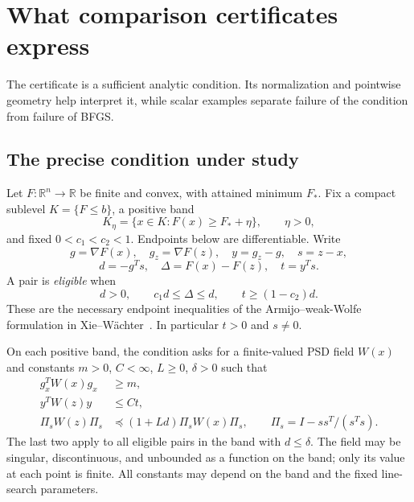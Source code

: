 \chapter{What comparison certificates express}\label{comp:G}\label{G:chapter}
\renewcommand{\ModuleTag}{5}
The certificate is a sufficient analytic condition. Its normalization and pointwise geometry help interpret it, while scalar examples separate failure of the condition from failure of BFGS.


\begingroup
\providecommand{\R}{}
\renewcommand{\R}{\mathbb R}
\providecommand{\PSD}{}
\renewcommand{\PSD}{\succeq0}
\providecommand{\range}{}
\renewcommand{\range}{\operatorname{range}}
\providecommand{\aff}{}
\renewcommand{\aff}{\operatorname{aff}}
\providecommand{\conv}{}
\renewcommand{\conv}{\operatorname{conv}}
\providecommand{\norm}{}
\renewcommand{\norm}[1]{\left\|#1\right\|}
\providecommand{\ip}{}
\renewcommand{\ip}[2]{\langle #1,#2\rangle}
\makeatletter\let\c@lemma\c@theorem\let\c@corollary\c@theorem\let\c@proposition\c@theorem\let\c@remark\c@theorem\makeatother
\renewcommand{\thelemma}{\thetheorem}\renewcommand{\thecorollary}{\thetheorem}\renewcommand{\theproposition}{\thetheorem}\renewcommand{\theremark}{\thetheorem}
\renewcommand{\thetheorem}{5.\arabic{section}.\arabic{theorem}}
\setcounter{section}{0}
\setcounter{theorem}{0}
\setcounter{equation}{0}


\section{The precise condition under study}
Let $F:\R^n\to\R$ be finite and convex, with attained minimum $F_*$. Fix a compact sublevel $K=\{F\le b\}$, a positive band
\[
 K_\eta=\{x\in K:F(x)\ge F_*+\eta\},\qquad \eta>0,
\]
and fixed $0<c_1<c_2<1$. Endpoints below are differentiable. Write
\[
 g=\nabla F(x),\quad g_z=\nabla F(z),\quad y=g_z-g,\quad s=z-x,
\]
\[
 d=-g^Ts,\quad \Delta=F(x)-F(z),\quad t=y^Ts.
\]
A pair is \emph{eligible} when
\begin{equation}
 d>0,\qquad c_1d\le\Delta\le d,\qquad t\ge(1-c_2)d. \tag{5.E}
\end{equation}
These are the necessary endpoint inequalities of the Armijo--weak-Wolfe formulation in Xie--W\"achter~\cite{XW}. In particular $t>0$ and $s\ne0$.

On each positive band, the condition asks for a finite-valued PSD field $W(x)$ and constants $m>0$, $C<\infty$, $L\ge0$, $\delta>0$ such that
\begin{align}
 g_x^TW(x)g_x&\ge m, \tag{5.V}\\
 y^TW(z)y&\le Ct, \tag{5.S}\\
 \Pi_sW(z)\Pi_s&\preceq(1+Ld)\Pi_sW(x)\Pi_s,
 \qquad \Pi_s=I-ss^T/(s^Ts). \tag{5.T}
\end{align}
The last two apply to all eligible pairs in the band with $d\le\delta$. The field may be singular, discontinuous, and unbounded as a function on the band; only its value at each point is finite. All constants may depend on the band and the fixed line-search parameters.

